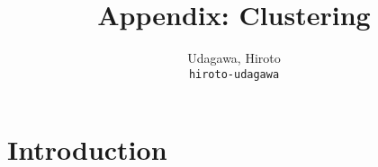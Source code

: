 \documentclass[11pt]{article}
\title{Appendix: Clustering}
\author{
  Udagawa, Hiroto\\
  \texttt{hiroto-udagawa}
}
\begin{document}
\maketitle

\section{Introduction}



\end{document}
